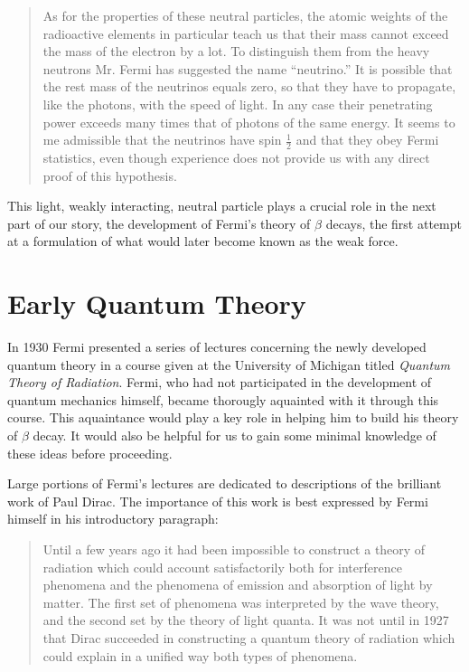 \documentclass[12pt]{book}
\begin{document}
\begin{quote}

   As for the properties of these neutral particles, the atomic weights of
the radioactive elements in particular teach us that their mass cannot
exceed the mass of the electron by a lot. To distinguish them from the
heavy neutrons Mr. Fermi has suggested the name ``neutrino.'' It is possible that the rest mass of the neutrinos equals zero, so that they have to
propagate, like the photons, with the speed of light. In any case their
penetrating power exceeds many times that of photons of the same
energy. It seems to me admissible that the neutrinos have spin $\frac{1}{2}$ and that
they obey Fermi statistics, even though experience does not provide us
with any direct proof of this hypothesis.

\end{quote}

This light, weakly interacting, neutral particle plays a crucial role in the next part of our story, the development of Fermi's theory of $\beta$ decays, the first attempt at a formulation of what would later become known as the weak force.

\section{Early Quantum Theory}

In 1930 Fermi presented a series of lectures concerning the newly developed quantum theory in a course given at the University of Michigan titled \emph{Quantum Theory of Radiation}\cite{fermi:quant}. Fermi, who had not participated in the development of quantum mechanics himself, became thorougly aquainted with it through this course. This aquaintance would play a key role in helping him to build his theory of $\beta$ decay. It would also be helpful for us to gain some minimal knowledge of these ideas before proceeding.

Large portions of Fermi's lectures are dedicated to descriptions of the brilliant work of Paul Dirac. The importance of this work is best expressed by Fermi himself in his introductory paragraph:

\begin{quote}
 Until a few years ago it had been impossible to construct a theory of radiation which could account satisfactorily both for interference phenomena and the phenomena of emission and absorption of light by matter. The first set of phenomena was interpreted by the wave theory, and the second set by the theory of light quanta. It was not until in 1927 that Dirac succeeded in constructing a quantum theory of radiation which could explain in a unified way both types of phenomena.
\end{quote}
\end{document}
